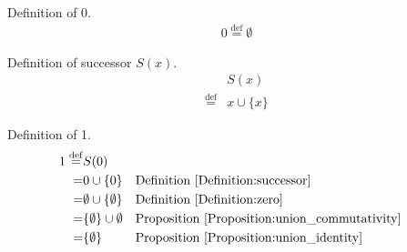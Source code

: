 \begin{defn}
\label{Definition:zero}
Definition of 0.
\begin{align*}
0 \overset{\operatorname{def}}{=} \emptyset
\end{align*}
\end{defn}

\begin{defn}
\label{Definition:successor}
Definition of successor $S(x)$.
\begin{align*}
& S(x) \\
\overset{\operatorname{def}}{=} & x \cup \{ x \}
\end{align*}
\end{defn}

\begin{defn}
\label{Definition:one}
Definition of 1.
\begin{align*}
1 \overset{\operatorname{def}}{=} & S(0) \\
= & 0 \cup \{ 0 \} && \text{Definition \ref{Definition:successor}} \\
= & \emptyset \cup \{ \emptyset \} && \text{Definition \ref{Definition:zero}} \\
= & \{ \emptyset \} \cup \emptyset && \text{Proposition \ref{Proposition:union_commutativity}} \\
= & \{ \emptyset \} && \text{Proposition \ref{Proposition:union_identity}} \\
\end{align*}
\end{defn}